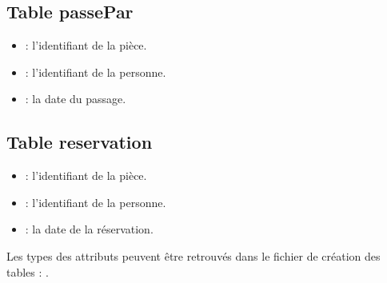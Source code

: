 \subsection{Table passePar}
\begin{itemize}
	\item {} : l'identifiant de la pièce.
	\item {} : l'identifiant de la personne.
	\item {} : la date du passage.
\end{itemize}

\subsection{Table reservation}
\begin{itemize}
	\item {} : l'identifiant de la pièce.
	\item {} : l'identifiant de la personne.
	\item {} : la date de la réservation.
\end{itemize}

\vspace{30px}
Les types des attributs peuvent être retrouvés dans le fichier de création des tables : .